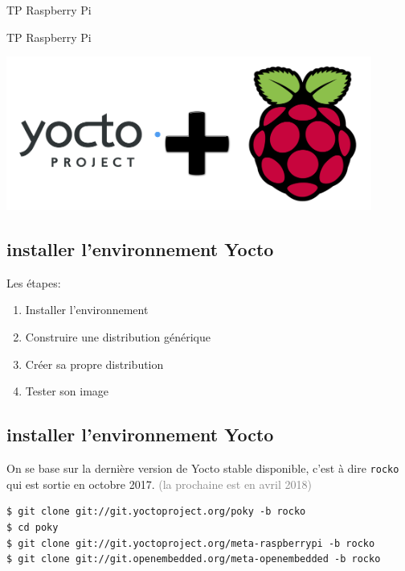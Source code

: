 \documentclass[compress]{smilebeamer}
\begin{document}
\begin{frame}{TP Raspberry Pi}
\end{frame}

\begin{frame}{TP Raspberry Pi}
\begin{center}
\includegraphics[width=0.9\textwidth]{logos/yocto_plus_raspberry_pi.png}
\end{center}
\end{frame}

\subsection{installer l'environnement Yocto}
\begin{frame}
Les étapes:
\begin{enumerate}
	\item Installer l'environnement
	\item Construire une distribution générique
	\item Créer sa propre distribution
	\item Tester son image
\end{enumerate}
\end{frame}

\subsection{installer l'environnement Yocto}
\begin{frame}[fragile]
On se base sur la dernière version de Yocto stable disponible, c'est à dire \texttt{rocko} qui est sortie en octobre 2017. \textcolor{gray}{\tiny{(la prochaine est en avril 2018)}}
\begin{lstlisting}[style=shell]
$ git clone git://git.yoctoproject.org/poky -b rocko
$ cd poky
$ git clone git://git.yoctoproject.org/meta-raspberrypi -b rocko
$ git clone git://git.openembedded.org/meta-openembedded -b rocko
\end{lstlisting}
\end{frame}
\end{document}

